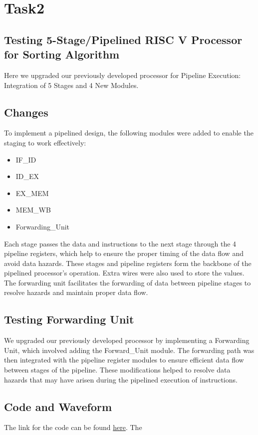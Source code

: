 \documentclass{report}
\begin{document}
\newpage

\section{Task2}
\subsection{Testing 5-Stage/Pipelined RISC V Processor for Sorting Algorithm}

Here we upgraded our previously developed processor for Pipeline Execution: Integration of 5 Stages and 4 New Modules.

\subsection{Changes}

To implement a pipelined design, the following modules were added to enable the staging to work effectively:
\begin{itemize}
\item IF\_ID
\item ID\_EX
\item EX\_MEM
\item MEM\_WB
\item Forwarding\_Unit
\end{itemize}

Each stage passes the data and instructions to the next stage through the 4 pipeline registers, which help to ensure the proper timing of the data flow and avoid data hazards. These stages and pipeline registers form the backbone of the pipelined processor's operation. Extra wires were also used to store the values. The forwarding unit facilitates the forwarding of data between pipeline stages to resolve hazards and maintain proper data flow.

\subsection{Testing Forwarding Unit}

We upgraded our previously developed processor by implementing a Forwarding Unit, which involved adding the Forward\_Unit module. The forwarding path was then integrated with the pipeline register modules to ensure efficient data flow between stages of the pipeline. These modifications helped to resolve data hazards that may have arisen during the pipelined execution of instructions.
\pagebreak
\subsection{Code and Waveform}
The link for the code can be found \href{https://github.com/NehalNN10/CA-final-project/blob/5b606f284db6f33765f0c830730e5cee43c01f18/final_project/final_project.srcs/sources_1/new/pipelinedProcessor.v}{here}. The
\end{document}
